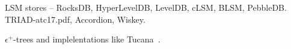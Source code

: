 LSM stores -- RocksDB, HyperLevelDB, LevelDB, cLSM, BLSM, PebbleDB.
TRIAD-atc17.pdf, 
Accordion, 
Wiskey.

$\epsilon^+$-trees and implelentations like Tucana~\cite{tucana}.

